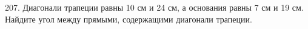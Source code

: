 207. Диагонали трапеции равны 10 см и 24 см, а основания равны 7 см и 19 см. Найдите угол между прямыми, содержащими диагонали трапеции.\\
